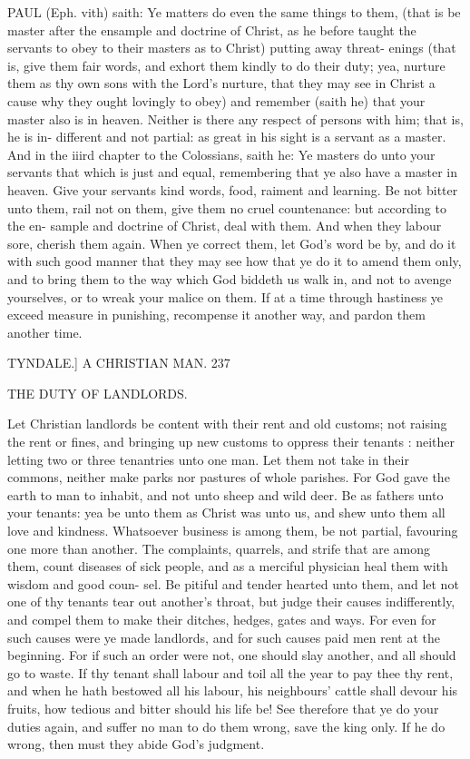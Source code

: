 \documentclass{custom}
\begin{document}
{PAUL (Eph. vith) saith: Ye matters do even the same 
things to them, (that is be master after the ensample 
and doctrine of Christ, as he before taught the servants to 
obey to their masters as to Christ) putting away threat- 
enings (that is, give them fair words, and exhort them 
kindly to do their duty; yea, nurture them as thy own 
sons with the Lord's nurture, that they may see in Christ 
a cause why they ought lovingly to obey) and remember 
(saith he) that your master also is in heaven. Neither is 
there any respect of persons with him; that is, he is in- 
different and not partial: as great in his sight is a servant 
as a master. And in the iiird chapter to the Colossians, 
saith he: Ye masters do unto your servants that which is 
just and equal, remembering that ye also have a master in 
heaven. Give your servants kind words, food, raiment 
and learning. Be not bitter unto them, rail not on them, 
give them no cruel countenance: but according to the en- 
sample and doctrine of Christ, deal with them. And 
when they labour sore, cherish them again. When ye 
correct them, let God's word be by, and do it with such 
good manner that they may see how that ye do it to amend 
them only, and to bring them to the way which God 
biddeth us walk in, and not to avenge yourselves, or to 
wreak your malice on them. If at a time through hastiness 
ye exceed measure in punishing, recompense it another 
way, and pardon them another time. 


TYNDALE.] 
A CHRISTIAN MAN.
237 

THE DUTY OF LANDLORDS. 

Let Christian landlords be content with their rent and 
old customs; not raising the rent or fines, and bringing 
up new customs to oppress their tenants : neither letting 
two or three tenantries unto one man. Let them not take 
in their commons, neither make parks nor pastures of 
whole parishes. For God gave the earth to man to inhabit, 
and not unto sheep and wild deer. Be as fathers unto 
your tenants: yea be unto them as Christ was unto us, 
and shew unto them all love and kindness. Whatsoever 
business is among them, be not partial, favouring one more 
than another. The complaints, quarrels, and strife that 
are among them, count diseases of sick people, and as a 
merciful physician heal them with wisdom and good coun- 
sel. Be pitiful and tender hearted unto them, and let not 
one of thy tenants tear out another's throat, but judge 
their causes indifferently, and compel them to make their 
ditches, hedges, gates and ways. For even for such causes 
were ye made landlords, and for such causes paid men rent 
at the beginning. For if such an order were not, one 
should slay another, and all should go to waste. If thy 
tenant shall labour and toil all the year to pay thee thy rent, 
and when he hath bestowed all his labour, his neighbours' 
cattle shall devour his fruits, how tedious and bitter should 
his life be! See therefore that ye do your duties again, and 
suffer no man to do them wrong, save the king only. If 
he do wrong, then must they abide God's judgment. 

}
\end{document}
